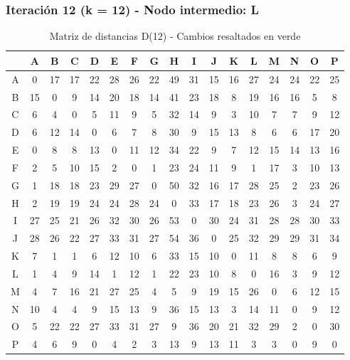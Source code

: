 \documentclass[12pt]{article}
\begin{document}
\subsubsection{Iteración 12 (k = 12) - Nodo intermedio: L}
\begin{table}[h!]
\centering
\begin{tabular}{|c|c|c|c|c|c|c|c|c|c|c|c|c|c|c|c|c|}
\hline
 & A & B & C & D & E & F & G & H & I & J & K & L & M & N & O & P \\\hline
A & 0 & 17 & 17 & 22 & 28 & 26 & 22 & \cellcolor{lightgreen} 49 & 31 & 15 & 16 & 27 & 24 & 24 & 22 & 25 \\\hline
B & 15 & 0 & 9 & 14 & 20 & 18 & 14 & \cellcolor{lightgreen} 41 & 23 & 18 & 8 & 19 & 16 & 16 & 5 & 8 \\\hline
C & 6 & 4 & 0 & 5 & 11 & 9 & 5 & \cellcolor{lightgreen} 32 & 14 & 9 & 3 & 10 & 7 & 7 & 9 & 12 \\\hline
D & 6 & \cellcolor{lightgreen} 12 & 14 & 0 & 6 & 7 & 8 & \cellcolor{lightgreen} 30 & 9 & 15 & 13 & 8 & 6 & 6 & \cellcolor{lightgreen} 17 & \cellcolor{lightgreen} 20 \\\hline
E & 0 & 8 & 8 & 13 & 0 & 11 & 12 & \cellcolor{lightgreen} 34 & 22 & 9 & 7 & 12 & 15 & 14 & 13 & 16 \\\hline
F & 2 & \cellcolor{lightgreen} 5 & 10 & 15 & \cellcolor{lightgreen} 2 & 0 & 1 & \cellcolor{lightgreen} 23 & 24 & \cellcolor{lightgreen} 11 & 9 & 1 & 17 & 3 & \cellcolor{lightgreen} 10 & \cellcolor{lightgreen} 13 \\\hline
G & 1 & 18 & 18 & 23 & 29 & 27 & 0 & \cellcolor{lightgreen} 50 & 32 & 16 & 17 & 28 & 25 & 2 & 23 & 26 \\\hline
H & 2 & 19 & 19 & 24 & \cellcolor{lightgreen} 24 & 28 & 24 & 0 & 33 & 17 & 18 & 23 & 26 & 3 & 24 & 27 \\\hline
I & 27 & 25 & 21 & 26 & 32 & 30 & 26 & \cellcolor{lightgreen} 53 & 0 & 30 & 24 & 31 & 28 & 28 & 30 & 33 \\\hline
J & 28 & 26 & 22 & 27 & 33 & 31 & 27 & \cellcolor{lightgreen} 54 & 36 & 0 & 25 & 32 & 29 & 29 & 31 & 34 \\\hline
K & 7 & 1 & 1 & 6 & 12 & 10 & 6 & \cellcolor{lightgreen} 33 & 15 & 10 & 0 & 11 & 8 & 8 & 6 & 9 \\\hline
L & 1 & 4 & 9 & 14 & 1 & 12 & 1 & 22 & 23 & 10 & 8 & 0 & 16 & 3 & 9 & 12 \\\hline
M & 4 & 7 & 16 & 21 & 27 & 25 & 4 & 5 & 9 & 19 & 15 & 26 & 0 & 6 & 12 & 15 \\\hline
N & 10 & 4 & 4 & 9 & 15 & 13 & 9 & \cellcolor{lightgreen} 36 & 15 & 13 & 3 & 14 & 11 & 0 & 9 & 12 \\\hline
O & 5 & 22 & 22 & 27 & 33 & 31 & 27 & 9 & 36 & 20 & 21 & 32 & 29 & 2 & 0 & 30 \\\hline
P & 4 & 6 & 9 & 0 & \cellcolor{lightgreen} 4 & 2 & 3 & 13 & 9 & \cellcolor{lightgreen} 13 & 11 & 3 & 3 & 0 & 9 & 0 \\\hline
\end{tabular}
\caption{Matriz de distancias D(12) - Cambios resaltados en verde}
\end{table}
\end{document}
